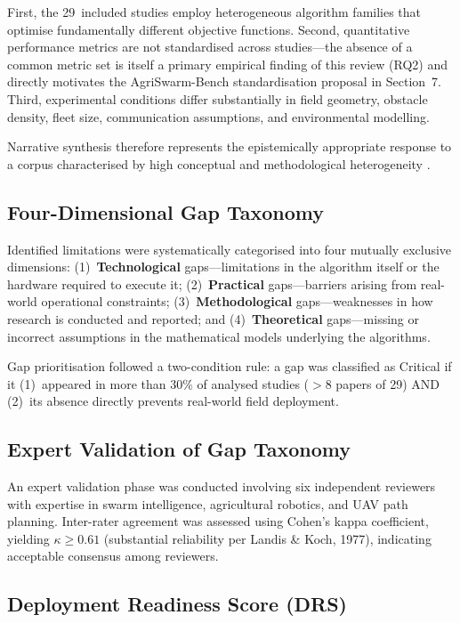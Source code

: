 \documentclass[review,3p]{elsarticle}
\begin{document}
First, the 29~included studies employ heterogeneous algorithm families that
optimise fundamentally different objective functions. Second, quantitative
performance metrics are not standardised across studies---the absence of a
common metric set is itself a primary empirical finding of this review (RQ2)
and directly motivates the AgriSwarm-Bench standardisation proposal in
Section~7. Third, experimental conditions differ substantially in field
geometry, obstacle density, fleet size, communication assumptions, and
environmental modelling.

Narrative synthesis therefore represents the epistemically appropriate response
to a corpus characterised by high conceptual and methodological heterogeneity
\cite{page2021,brambilla2013}.

\subsection{Four-Dimensional Gap Taxonomy}

Identified limitations were systematically categorised into four mutually
exclusive dimensions: (1)~\textbf{Technological} gaps---limitations in the
algorithm itself or the hardware required to execute it; (2)~\textbf{Practical}
gaps---barriers arising from real-world operational constraints; (3)~\textbf{Methodological}
gaps---weaknesses in how research is conducted and reported; and
(4)~\textbf{Theoretical} gaps---missing or incorrect assumptions in the
mathematical models underlying the algorithms.

Gap prioritisation followed a two-condition rule: a gap was classified as
Critical if it (1)~appeared in more than 30\% of analysed studies ($>$8 papers
of 29) AND (2)~its absence directly prevents real-world field deployment.

\subsection{Expert Validation of Gap Taxonomy}
\label{subsec:expert_validation}

An expert validation phase was conducted involving six independent reviewers
with expertise in swarm intelligence, agricultural robotics, and UAV path
planning. Inter-rater agreement was assessed using Cohen's kappa coefficient,
yielding $\kappa \geq 0.61$ (substantial reliability per Landis \& Koch,
1977), indicating acceptable consensus among reviewers.

\subsection{Deployment Readiness Score (DRS)}
\label{subsec:drs}
\end{document}
